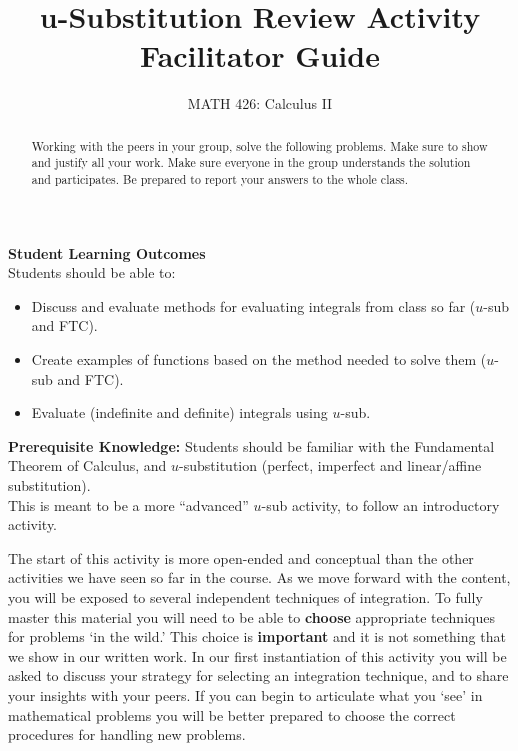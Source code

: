 \documentclass{ximera}
\title{u-Substitution Review Activity Facilitator Guide}
\author{MATH 426: Calculus II}
\begin{document}
\begin{abstract}
   Working with the peers in your group, solve the following problems. Make sure to show and justify all your work. Make sure everyone in the group understands the solution and participates. Be prepared to report your answers to the whole class. 
\end{abstract}
\maketitle

\textbf{Student Learning Outcomes}\\
Students should be able to:
\begin{itemize}
    \item Discuss and evaluate methods for evaluating integrals from class so far ($u$-sub and FTC).
    \item Create examples of functions based on the method needed to solve them ($u$-sub and FTC).
    \item Evaluate (indefinite and definite) integrals using $u$-sub. 
\end{itemize}

\textbf{Prerequisite Knowledge:} Students should be familiar with the Fundamental Theorem of Calculus, and $u$-substitution (perfect, imperfect and linear/affine substitution).\\
This is meant to be a more ``advanced'' $u$-sub activity, to follow an introductory activity.  %


The start of this activity is more open-ended and conceptual than the other activities we have seen so far in the course. As we move forward with the content, you will be exposed to several independent techniques of integration. To fully master this material you will need to be able to \textbf{choose} appropriate techniques for problems `in the wild.' This choice is \textbf{important} and it is not something that we show in our written work. In our first instantiation of this activity you will be asked to discuss your strategy for selecting an integration technique, and to share your insights with your peers. If you can begin to articulate what you `see' in mathematical problems you will be better prepared to choose the correct procedures for handling new problems.\\
\end{document}
